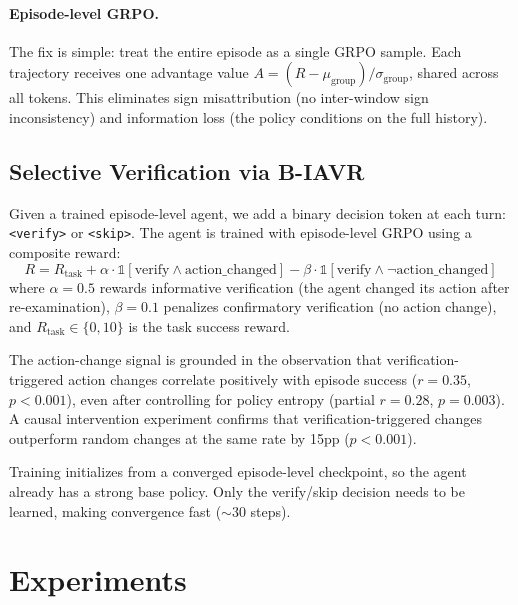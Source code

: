 \documentclass[10pt]{article}
\newcommand{\ours}{B-IAVR}
\begin{document}
\paragraph{Episode-level GRPO.}
The fix is simple: treat the entire episode as a single GRPO sample. Each trajectory receives one advantage value $A = (R - \mu_{\text{group}}) / \sigma_{\text{group}}$, shared across all tokens. This eliminates sign misattribution (no inter-window sign inconsistency) and information loss (the policy conditions on the full history).

\subsection{Selective Verification via \ours{}}
\label{sec:biavr}

Given a trained episode-level agent, we add a binary decision token at each turn: \texttt{<verify>} or \texttt{<skip>}. The agent is trained with episode-level GRPO using a composite reward:
\begin{equation}
R = R_{\text{task}} + \alpha \cdot \mathbb{1}[\text{verify} \wedge \text{action\_changed}] - \beta \cdot \mathbb{1}[\text{verify} \wedge \neg\text{action\_changed}]
\label{eq:reward}
\end{equation}
where $\alpha = 0.5$ rewards informative verification (the agent changed its action after re-examination), $\beta = 0.1$ penalizes confirmatory verification (no action change), and $R_{\text{task}} \in \{0, 10\}$ is the task success reward.

The action-change signal is grounded in the observation that verification-triggered action changes correlate positively with episode success ($r = 0.35$, $p < 0.001$), even after controlling for policy entropy (partial $r = 0.28$, $p = 0.003$). A causal intervention experiment confirms that verification-triggered changes outperform random changes at the same rate by 15pp ($p < 0.001$).

Training initializes from a converged episode-level checkpoint, so the agent already has a strong base policy. Only the verify/skip decision needs to be learned, making convergence fast (${\sim}30$ steps).

\section{Experiments}
\end{document}
